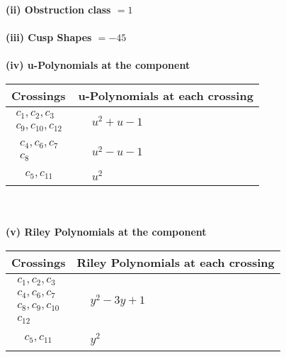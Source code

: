 \documentclass[1p]{elsarticle_modified}
\theoremstyle{definition}
\begin{document}
\flushleft \textbf{(ii) Obstruction class $= 1$}\\~\\
\flushleft \textbf{(iii) Cusp Shapes $= -45$}\\~\\
\newpage\renewcommand{\arraystretch}{1}
\flushleft \textbf{(iv) u-Polynomials at the component}\newline \\
\begin{tabular}{m{50pt}|m{274pt}}
Crossings & \hspace{64pt}u-Polynomials at each crossing \\
\hline $$\begin{aligned}c_{1},c_{2},c_{3}\\c_{9},c_{10},c_{12}\end{aligned}$$&$\begin{aligned}
&u^2+u-1
\end{aligned}$\\
\hline $$\begin{aligned}c_{4},c_{6},c_{7}\\c_{8}\end{aligned}$$&$\begin{aligned}
&u^2- u-1
\end{aligned}$\\
\hline $$\begin{aligned}c_{5},c_{11}\end{aligned}$$&$\begin{aligned}
&u^2
\end{aligned}$\\
\hline
\end{tabular}\\~\\
\newpage\renewcommand{\arraystretch}{1}
\flushleft \textbf{(v) Riley Polynomials at the component}\newline \\
\begin{tabular}{m{50pt}|m{274pt}}
Crossings & \hspace{64pt}Riley Polynomials at each crossing \\
\hline $$\begin{aligned}c_{1},c_{2},c_{3}\\c_{4},c_{6},c_{7}\\c_{8},c_{9},c_{10}\\c_{12}\end{aligned}$$&$\begin{aligned}
&y^2-3 y+1
\end{aligned}$\\
\hline $$\begin{aligned}c_{5},c_{11}\end{aligned}$$&$\begin{aligned}
&y^2
\end{aligned}$\\
\hline
\end{tabular}\\~\\
\end{document}
